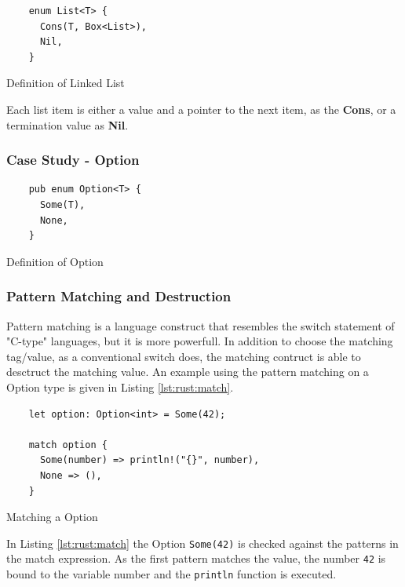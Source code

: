 \begin{listing}[H]
  \begin{verbatim}
    enum List<T> {
      Cons(T, Box<List>),
      Nil,
    }
  \end{verbatim}
  \caption{Definition of Linked List}
  \label{lst:rust:list}
\end{listing}

Each list item is either a value and a pointer to the next item, as the \textbf{Cons}, or a termination value as \textbf{Nil}.

\subsubsection{Case Study - Option}

\begin{listing}[H]
  \begin{verbatim}
    pub enum Option<T> {
      Some(T),
      None,
    }
  \end{verbatim}
  \caption{Definition of Option}
  \label{lst:rust:option}
\end{listing}

\subsubsection{Pattern Matching and Destruction}

Pattern matching is a language construct that resembles the switch statement of "C-type" languages, but it is more powerfull.
In addition to choose the matching tag/value, as a conventional switch does, the matching contruct is able to desctruct the matching value.
An example using the pattern matching on a Option type is given in Listing \ref{lst:rust:match}.

\begin{listing}[H]
  \begin{verbatim}
    let option: Option<int> = Some(42);

    match option {
      Some(number) => println!("{}", number),
      None => (),
    }
  \end{verbatim}
  \caption{Matching a Option}
  \label{lst:rust:match}
\end{listing}

In Listing \ref{lst:rust:match} the Option \texttt{Some(42)} is checked against the patterns in the match expression.
As the first pattern matches the value, the number \texttt{42} is bound to the variable number and the \texttt{println} function is executed.

